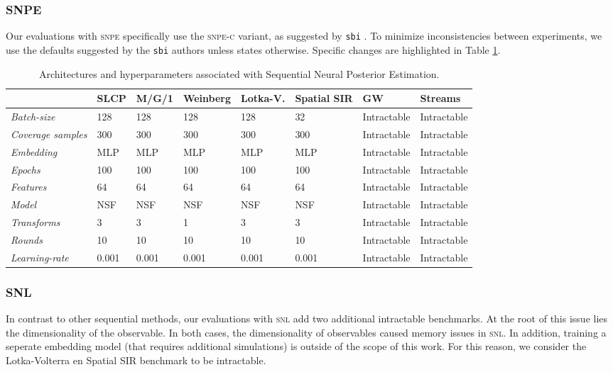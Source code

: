 \documentclass[twoside]{article}
\begin{document}
\subsubsection{SNPE}
Our evaluations with \textsc{snpe} specifically use the \textsc{snpe-c} \citep{greenberg2019automatic} variant, as suggested by \texttt{sbi} \citep{sbi}.
To minimize inconsistencies between experiments, we use the defaults suggested by the \texttt{sbi} authors unless states otherwise. Specific changes are highlighted in Table \ref{tab:snpe_hyperparameters}.

\begin{table}[h!]
    \centering
    \begin{tabular}{llllllll}
        \toprule
        & SLCP & M/G/1 & Weinberg & Lotka-V. & Spatial SIR & GW & Streams \\
        \midrule
        \emph{Batch-size} & 128 & 128 & 128 & 128 & 32 & Intractable & Intractable \\
        \emph{Coverage samples} & 300 & 300 & 300 & 300 & 300 & Intractable & Intractable \\
        \emph{Embedding} & MLP & MLP & MLP & MLP & MLP & Intractable & Intractable \\ 
        \emph{Epochs} & 100 & 100 & 100 & 100 & 100 & Intractable & Intractable \\
        \emph{Features} & 64 & 64 & 64 & 64 & 64 & Intractable & Intractable \\
        \emph{Model} & NSF & NSF & NSF & NSF & NSF & Intractable & Intractable \\
        \emph{Transforms} & 3 & 3 & 1 & 3 & 3 & Intractable & Intractable \\
        \emph{Rounds} & 10 & 10 & 10 & 10 & 10 & Intractable & Intractable \\
        \emph{Learning-rate} & 0.001 & 0.001 & 0.001 & 0.001 & 0.001 & Intractable & Intractable \\
        \bottomrule
    \end{tabular}
    \caption{Architectures and hyperparameters associated with Sequential Neural Posterior Estimation.}
    \label{tab:snpe_hyperparameters}
\end{table}

\subsubsection{SNL}
In contrast to other sequential methods, our evaluations with \textsc{snl} \citep{papamakarios2019sequential} add two additional intractable benchmarks. At the root of this issue lies the dimensionality of the observable. In both cases, the dimensionality of observables caused memory issues in \textsc{snl}. In addition, training a seperate embedding model (that requires additional simulations) is outside of the scope of this work. For this reason, we consider the Lotka-Volterra en Spatial SIR benchmark to be intractable.
\end{document}
